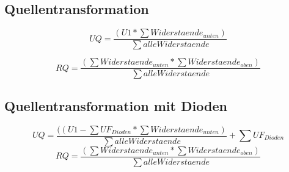 \subsection{Quellentransformation}
\[UQ = \frac{(U1 * \sum{Widerstaende_{unten}})}{\sum{alle Widerstaende}}\]


\[RQ = \frac{(\sum{Widerstaende_{unten}} * \sum{Widerstaende_{oben}})}{\sum{alle Widerstaende}}\]

\subsection{Quellentransformation mit Dioden}
\[UQ = \frac{((U1-\sum{UF_{Dioden}} * \sum{Widerstaende_{unten}})}{\sum{alle Widerstaende}} + \sum{UF_{Dioden}}\]
\[RQ = \frac{(\sum{Widerstaende_{unten}} * \sum{Widerstaende_{oben}})}{\sum{alle Widerstaende}}\]
